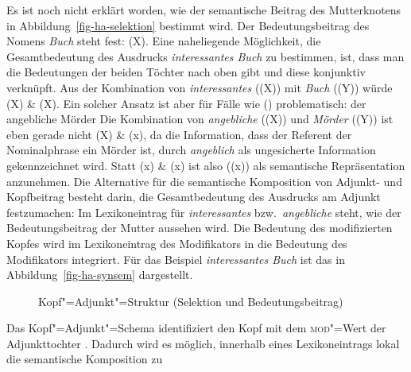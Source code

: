 Es ist noch nicht erklärt worden, wie der semantische Beitrag des Mutterknotens in
Abbildung~\ref{fig-ha-selektion} bestimmt wird. Der Bedeutungsbeitrag des Nomens
\emph{Buch} steht fest: (X). Eine naheliegende Möglichkeit, die Gesamtbedeutung
des Ausdrucks \emph{interessantes Buch} zu bestimmen, ist, dass man die Bedeutungen 
der beiden Töchter nach oben gibt und diese konjunktiv verknüpft.
Aus der Kombination von \emph{interessantes} ((X)) mit \emph{Buch} ((Y))
würde (X) \& (X). Ein solcher Ansatz ist aber für Fälle wie ()
problematisch:
\ea
der angebliche Mörder
\z
Die Kombination von \emph{angebliche} ((X)) und {\em Mörder\/} ((Y)) ist eben
gerade nicht (X) \& (x), da die Information, dass der Referent der Nominalphrase
ein Mörder ist, durch \emph{angeblich} als ungesicherte Information gekennzeichnet wird.
Statt (x) \& (x) ist also ((x)) als semantische Repräsentation
anzunehmen.
Die Alternative für die semantische Komposition von Adjunkt- und Kopfbeitrag
besteht darin, die Gesamtbedeutung des Ausdrucks am Adjunkt festzumachen:
Im Lexikoneintrag für \emph{interessantes} bzw.\ \emph{angebliche}
steht, wie der Bedeutungsbeitrag der Mutter aussehen wird.
Die Bedeutung des modifizierten Kopfes wird im Lexikoneintrag des Modifikators 
in die Bedeutung des Modifikators integriert. Für das Beispiel \emph{interessantes Buch} ist das
in Abbildung~\vref{fig-ha-synsem} dargestellt.
\begin{figure}
\caption{\label{fig-ha-synsem}Kopf"=Adjunkt"=Struktur (Selektion und Bedeutungsbeitrag)}
\end{figure}
Das Kopf"=Adjunkt"=Schema identifiziert den Kopf mit dem \textsc{mod}"=Wert der Adjunkttochter .
Dadurch wird es möglich, innerhalb eines Lexikoneintrags lokal die semantische Komposition zu
